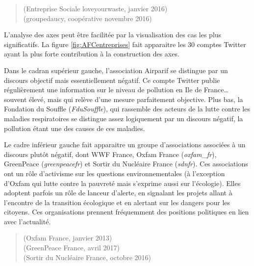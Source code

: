             \begin{quotation}
                 (Entreprise Sociale loveyourwaste, janvier 2016) \\

                 (groupedaucy, coopérative novembre 2016)
            \end{quotation}

            L’analyse des axes peut être facilitée par la visualisation des cas les plus significatifs. La figure \ref{fig:AFCentreprises} fait apparaitre les 30 comptes Twitter ayant la plus forte contribution à la construction des axes.

            Dans le cadran supérieur gauche, l’association Airparif se distingue par un discours objectif mais essentiellement négatif. Ce compte Twitter publie régulièrement une information sur le niveau de pollution en Ile de France… souvent élevé, mais qui relève d’une mesure parfaitement objective.  Plus bas, la Fondation du Souffle (\textit{FduSouffle}), qui rassemble des acteurs de la lutte contre les maladies respiratoires se distingue assez logiquement par un discours négatif, la pollution étant une des causes de ces maladies.

            Le cadre inférieur gauche fait apparaitre un groupe d’associations associées à un discours plutôt négatif, dont WWF France, Oxfam France (\textit{oxfam\_fr}), GreenPeace (\textit{greenpeacefr}) et Sortir du Nucléaire France (\textit{sdnfr}). Ces associations ont un rôle d’activisme sur les questions environnementales (à l’exception d’Oxfam qui lutte contre la pauvreté mais s’exprime aussi sur l’écologie). Elles adoptent parfois un rôle de lanceur d’alerte, en signalant les projets allant à l’encontre de la transition écologique et en alertant sur les dangers pour les citoyens. Ces organisations prennent fréquemment des positions politiques en lien avec l’actualité.


            \begin{quotation}
                 (Oxfam France, janvier 2013) \\
                 (GreenPeace France, avril 2017) \\
                 (Sortir du Nucléaire France, octobre 2016)

            \end{quotation}


